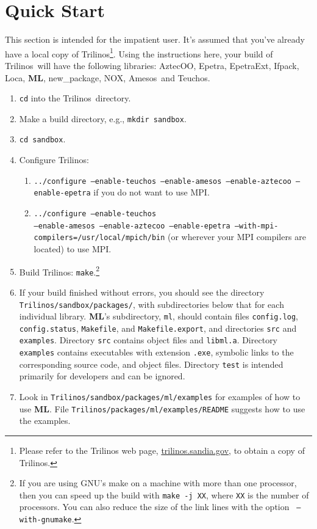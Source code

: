 \documentclass{article}[11pt]
\newcommand{\Aztecoo}  {{\sc AztecOO}}
\newcommand{\aztecoo}  {{\Aztecoo}}
\newcommand{\epetra}  {{\sc Epetra}}
\newcommand{\epetraext}  {{\sc EpetraExt}}
\newcommand{\ML}     {{\bf ML}}
\newcommand{\trilinos}  {{\sc Trilinos}}
\newcommand{\amesos}  {{\sc Amesos}}
\newcommand{\ifpack}  {{\sc Ifpack}}
\newcommand{\teuchos}  {{\sc Teuchos}}
\newcommand{\newpackage}  {{\sc new\_package}}
\newcommand{\nox}  {{\sc NOX}}
\newcommand{\loca}  {{\sc Loca}}
\newcommand{\be}  {\begin{enumerate}}
\newcommand{\ee}  {\end{enumerate}}
\newcommand \trilinosWeb {trilinos.sandia.gov}
\begin{document}
\section{Quick Start}
\label{quick start}
%
This section is intended for the impatient user.
It's assumed that you've already have a local copy of
\trilinos\footnote{Please refer to the Trilinos web page,
\href{http://\trilinosWeb}{\trilinosWeb},
to obtain a copy of \trilinos.}.
Using the instructions here, your build of \trilinos~will have the following
libraries: \aztecoo, \epetra, \epetraext, \ifpack, \loca, \ML, \newpackage,
\nox, \amesos~and \teuchos.
\be
\item \verb!cd! into the \trilinos~directory.
\item Make a build directory, e.g., \verb!mkdir sandbox!.
\item \verb!cd sandbox!.
\item Configure \trilinos:
  \be
  \item   {\tt ../configure --enable-teuchos --enable-amesos --enable-aztecoo
--enable-epetra}
 if you do not want to use MPI.
  \item   {\tt ../configure  --enable-teuchos \\
  --enable-amesos --enable-aztecoo --enable-epetra --with-mpi-compilers=/usr/local/mpich/bin} (or wherever your MPI compilers are
located) to use MPI.
  \ee
\item Build \trilinos: \verb!make!.\footnote{If you are using GNU's make on a
machine with more than one processor, then you can speed up the
build with {\tt make -j XX}, where {\tt XX} is the number of processors.  You
can also reduce the size of the link lines with the option {\tt
--with-gnumake}.}
\item If your build finished without errors, you should see the directory\\
\verb!Trilinos/sandbox/packages/!, with subdirectories below that for
each individual library.   \ML's subdirectory, \verb!ml!, should contain
files \verb!config.log!, \verb!config.status!, \verb!Makefile!, and
\verb!Makefile.export!, and directories \verb!src! and \verb!examples!.
Directory \verb!src! contains object files and \verb!libml.a!.
Directory \verb!examples! contains executables with extension \verb!.exe!,
symbolic links to the corresponding source code, and object files.
Directory \verb!test! is intended primarily for developers and can be ignored.
\item Look in \verb!Trilinos/sandbox/packages/ml/examples! for examples of how
to use \ML. File \verb!Trilinos/packages/ml/examples/README! suggests how to
use the examples.
\ee
%
%
\end{document}

